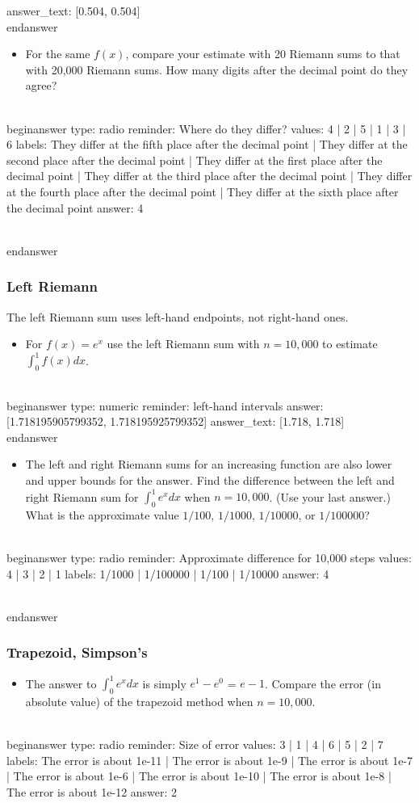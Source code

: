 \documentclass[12pt]{article}
\begin{document}
    answer_text: [0.504, 0.504] 
\\end{answer}
\begin{itemize}\item For the same $f(x)$, compare your estimate with 20 Riemann sums to   that with 20,000 Riemann sums. How many digits after the decimal   point do they agree?\end{itemize}
\\begin{answer}
type: radio
reminder: Where do they differ?
values: 4 | 2 | 5 | 1 | 3 | 6
labels: They differ at the fifth place after the decimal point | They differ at the second place after the decimal point | They differ at the first place after the decimal point | They differ at the third place after the decimal point | They differ at the fourth place after the decimal point | They differ at the sixth place after the decimal point
answer: 4

\\end{answer}
\subsubsection{Left Riemann}\newline
The left Riemann sum uses left-hand endpoints, not right-hand ones. \begin{itemize}\item For $f(x) = e^{x}$ use the left Riemann sum with $n=10,000$ to estimate $\int_0^1 f(x) dx$.\end{itemize}
\\begin{answer}
    type: numeric
    reminder: left-hand intervals
    answer: [1.718195905799352, 1.718195925799352]
    answer_text: [1.718, 1.718] 
\\end{answer}
\begin{itemize}\item The left and right Riemann sums for an increasing function are also   lower and upper bounds for the answer. Find the difference between   the left and right Riemann sum for $\int_0^1 e^x dx$ when   $n=10,000$. (Use your last answer.) What is the approximate value   $1/100$, $1/1000$, $1/10000$, or $1/100000$?\end{itemize}
\\begin{answer}
type: radio
reminder: Approximate difference for 10,000 steps
values: 4 | 3 | 2 | 1
labels: 1/1000 | 1/100000 | 1/100 | 1/10000
answer: 4

\\end{answer}
\subsubsection{Trapezoid, Simpson's}\begin{itemize}\item The answer to $\int_0^1 e^x dx$ is simply $e^1 - e^0$ =   $e-1$. Compare the error (in absolute value) of the trapezoid method when $n=10,000$.\end{itemize}
\\begin{answer}
type: radio
reminder: Size of error
values: 3 | 1 | 4 | 6 | 5 | 2 | 7
labels: The error is about 1e-11 | The error is about 1e-9 | The error is about 1e-7 | The error is about 1e-6 | The error is about 1e-10 | The error is about 1e-8 | The error is about 1e-12
answer: 2
\end{document}
